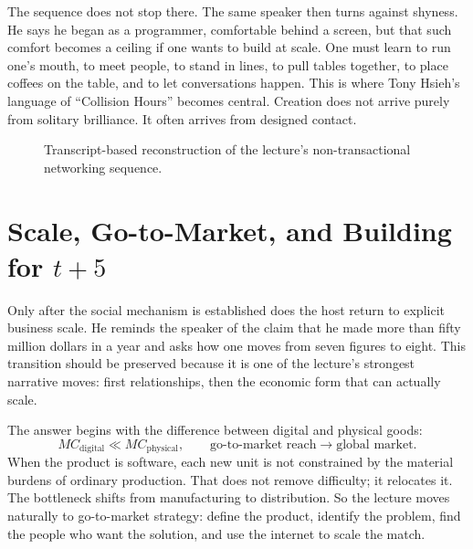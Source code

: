 The sequence does not stop there. The same speaker then turns against shyness. He says he began as a programmer, comfortable behind a screen, but that such comfort becomes a ceiling if one wants to build at scale. One must learn to run one's mouth, to meet people, to stand in lines, to pull tables together, to place coffees on the table, and to let conversations happen. This is where Tony Hsieh's language of ``Collision Hours'' becomes central. Creation does not arrive purely from solitary brilliance. It often arrives from designed contact.

\begin{figure}[h]
\centering
{}
\caption{Transcript-based reconstruction of the lecture's non-transactional networking sequence.}
\end{figure}

\section{Scale, Go-to-Market, and Building for \(t+5\)}

Only after the social mechanism is established does the host return to explicit business scale. He reminds the speaker of the claim that he made more than fifty million dollars in a year and asks how one moves from seven figures to eight. This transition should be preserved because it is one of the lecture's strongest narrative moves: first relationships, then the economic form that can actually scale.

The answer begins with the difference between digital and physical goods:
\begin{equation}
MC_{\text{digital}} \ll MC_{\text{physical}},
\qquad
\text{go-to-market reach} \to \text{global market}.
\end{equation}
When the product is software, each new unit is not constrained by the material burdens of ordinary production. That does not remove difficulty; it relocates it. The bottleneck shifts from manufacturing to distribution. So the lecture moves naturally to go-to-market strategy: define the product, identify the problem, find the people who want the solution, and use the internet to scale the match.

